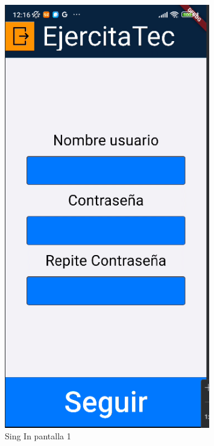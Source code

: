 \begin{figure}[H]
   \centering
    \includegraphics[width=0.8\textwidth]{pantallas/SingIn1.png}
    \caption{Sing In pantalla 1}
    \label{fig:SingIn1}
\end{figure}


